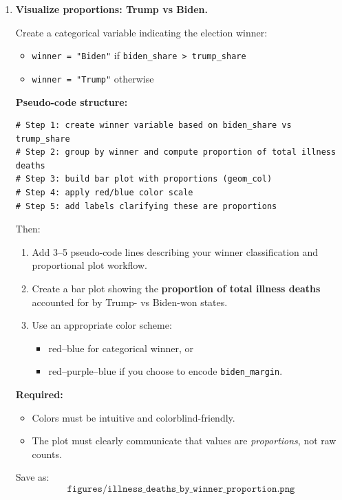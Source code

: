 \documentclass[11pt]{article}
\begin{document}
\begin{enumerate}
  \noindent Save as:
  \[
    \texttt{figures/total\_illness\_deaths\_by\_state.png}
  \]

  \item \textbf{Visualize proportions: Trump vs Biden.}

  Create a categorical variable indicating the election winner:
  \begin{itemize}
    \item \texttt{winner = "Biden"} if \texttt{biden\_share > trump\_share}
    \item \texttt{winner = "Trump"} otherwise
  \end{itemize}

  \textbf{Pseudo-code structure:}
\begin{verbatim}
# Step 1: create winner variable based on biden_share vs trump_share
# Step 2: group by winner and compute proportion of total illness deaths
# Step 3: build bar plot with proportions (geom_col)
# Step 4: apply red/blue color scale
# Step 5: add labels clarifying these are proportions
\end{verbatim}

  Then:
  \begin{enumerate}
    \item Add 3--5 pseudo-code lines describing your winner classification and proportional plot workflow.
    \item Create a bar plot showing the \textbf{proportion of total illness deaths} accounted for by Trump- vs Biden-won states.
    \item Use an appropriate color scheme:
    \begin{itemize}
      \item red--blue for categorical winner, or
      \item red--purple--blue if you choose to encode \texttt{biden\_margin}.
    \end{itemize}
  \end{enumerate}

  \noindent \textbf{Required:}
  \begin{itemize}
    \item Colors must be intuitive and colorblind-friendly.
    \item The plot must clearly communicate that values are \emph{proportions}, not raw counts.
  \end{itemize}

  \noindent Save as:
  \[
    \texttt{figures/illness\_deaths\_by\_winner\_proportion.png}
  \]


\end{enumerate}
\end{document}
